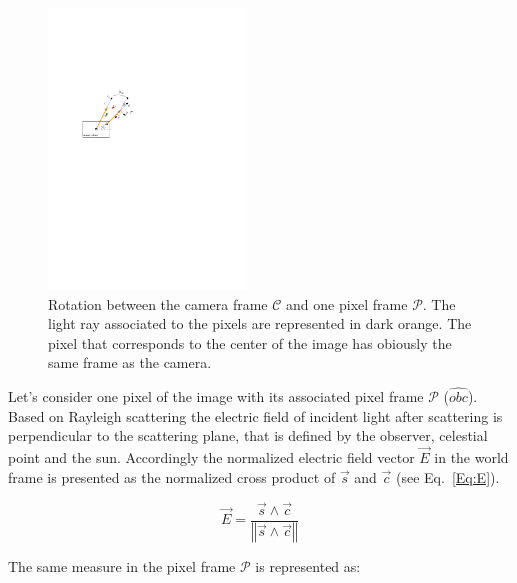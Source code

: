\begin{figure}
  \centering
  \includegraphics[width=0.47\textwidth]{./content/intro/figures/pixelframe.pdf}
  \caption{Rotation between the camera frame $\mathcal{C}$ and one pixel frame $\mathcal{P}$. The light ray associated to the pixels are represented in dark orange. The pixel that corresponds to the center of the image has obiously the same frame as the camera.}
    \label{fig:pixelframe}
\end{figure}


Let's consider one pixel of the image with its associated pixel frame $\mathcal{P}$ ($\widehat{obc}$).
Based on Rayleigh scattering the electric field of incident light after
scattering is perpendicular to the scattering plane, that is defined by the
observer, celestial point and the sun.  
Accordingly the normalized electric field vector $\vec{E}$ in the world frame
is presented as the normalized cross product of $\vec{s}$ and
$\vec{c}$ (see Eq.~\ref{Eq:E}).

\begin{equation}
\vec{E}=\frac{\vec{s}\wedge \vec{c}}{\left\Vert \vec{s}\wedge
    \vec{c}\right\Vert }
\label{Eq:E}
\end{equation}

The same measure in the pixel frame $\mathcal{P}$  is represented as:

